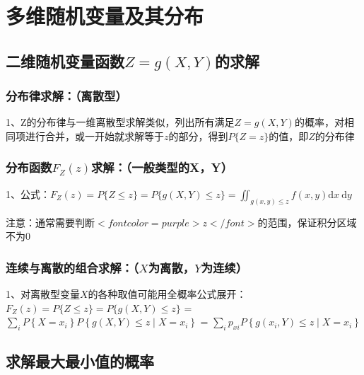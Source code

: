 \chapter{多维随机变量及其分布}

\section{二维随机变量函数$ Z=g(X, Y) $的求解}



\subsection{分布律求解：（离散型）}

1、Z的分布律与一维离散型求解类似，列出所有满足$ Z=g(X, Y) $的概率，对相同项进行合并，或一开始就求解等于$ z $的部分，得到$ P\{Z = z\} $的值，即$ Z $的分布律



\subsection{分布函数$ F_Z(z) $求解：（一般类型的X，Y）}

1、公式：$ F_{Z}(z)=P\{Z \leqslant z\}=P\{g(X, Y) \leqslant z\}=\iint_{g(x, y) \leqslant z} f(x, y) \mathrm{d} x \mathrm{~d} y $

注意：通常需要判断$ <font color=purple>z</font> $的范围，保证积分区域不为0



\subsection{连续与离散的组合求解：（$ X $为离散，$ Y $为连续）}

1、对离散型变量$ X $的各种取值可能用全概率公式展开：$ F_{Z}(z)=P\{Z \leqslant z\}=P\{g(X, Y) \leqslant z\} $ = $ \sum_{i} P\left\{X=x_{i}\right\} P\left\{g(X, Y) \leqslant z \mid X=x_{i}\right\} $ = $ \sum_{i} p_{xi} P\left\{g\left(x_{i}, Y\right) \leqslant z \mid X=x_{i}\right\} $

\section{求解最大最小值的概率}



